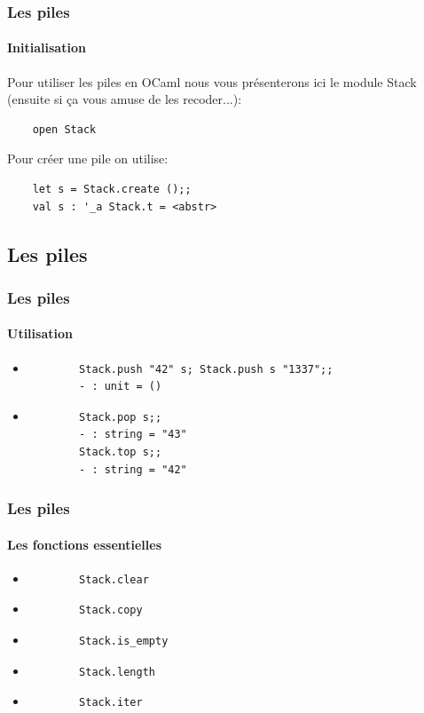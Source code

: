 \begin{frame}[fragile]
	\frametitle{Les piles}
	\framesubtitle{Initialisation}
	Pour utiliser les piles en OCaml nous vous présenterons ici le module Stack (ensuite si ça vous amuse de les recoder...):
	\begin{lstlisting}
	open Stack
	\end{lstlisting}
	Pour créer une pile on utilise:
	\begin{lstlisting}
	let s = Stack.create ();;
	val s : '_a Stack.t = <abstr>
	\end{lstlisting}
\end{frame}

\subsection{Les piles}
\begin{frame}[fragile]
\frametitle{Les piles}
\framesubtitle{Utilisation}
	\begin{itemize}
	
	\item
		\begin{lstlisting}
		Stack.push "42" s; Stack.push s "1337";;
		- : unit = ()	
		\end{lstlisting}	
	
	\item
		\begin{lstlisting}
		Stack.pop s;;
		- : string = "43"
		Stack.top s;;
		- : string = "42"
		\end{lstlisting}	

	\end{itemize}

\end{frame}

\begin{frame}[fragile]
	\frametitle{Les piles}
	\framesubtitle{Les fonctions essentielles}
	\begin{itemize}
	
	\item
		\begin{lstlisting}
		Stack.clear
		\end{lstlisting}

	\item
		\begin{lstlisting}
		Stack.copy
		\end{lstlisting}	

	\item
		\begin{lstlisting}
		Stack.is_empty
		\end{lstlisting}	

	\item
		\begin{lstlisting}
		Stack.length
		\end{lstlisting}	

	\item
		\begin{lstlisting}
		Stack.iter
		\end{lstlisting}

	\end{itemize}

\end{frame}

